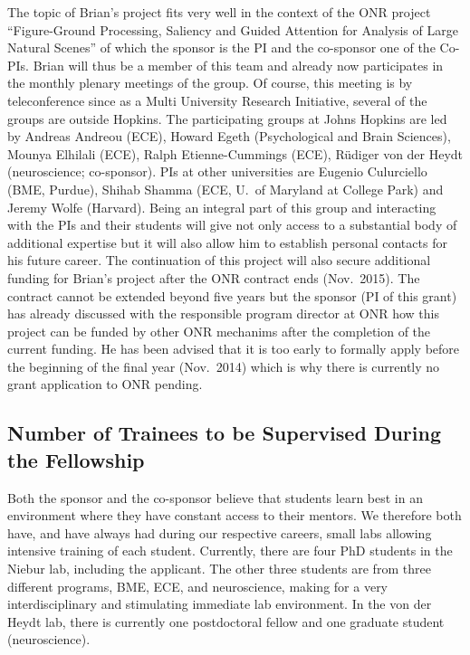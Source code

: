\documentclass[11pt,notitlepage]{article}
\begin{document}
The topic of Brian's project fits very well in the context of the
ONR project ``Figure-Ground Processing, Saliency and Guided
Attention for Analysis of Large Natural Scenes'' of which the sponsor
is the PI and the co-sponsor one of the Co-PIs. Brian will thus be a
member of this team and already now participates in the monthly
plenary meetings of the group. Of course, this meeting is by
teleconference since as a Multi University Research Initiative,
several of the groups are outside Hopkins. The participating groups at
Johns Hopkins are 
led
 by Andreas Andreou (ECE), Howard Egeth
(Psychological and Brain Sciences), Mounya Elhilali (ECE), Ralph
Etienne-Cummings (ECE), R\"udiger von der Heydt (neuroscience;
co-sponsor). PIs at other universities are Eugenio Culurciello (BME,
Purdue), Shihab Shamma (ECE, U.~of Maryland at College Park) and
Jeremy Wolfe (Harvard). Being 
an
integral part of this group and
interacting with the PIs and their students will give not only access
to a substantial body of additional expertise but it will also allow
him to establish personal contacts for his future career.
The continuation of this project will also secure additional funding
for Brian's project after the ONR contract ends (Nov.~2015). The
contract cannot be extended beyond five years but the sponsor (PI of
this grant) has already discussed with the responsible program
director at ONR how this project can be funded by other ONR mechanims
after the completion of the current funding. He has been advised that
it is too early to formally apply before the beginning of the final
year (Nov.~2014) which is why there is currently no grant application
to ONR pending.

\subsection*{Number of Trainees to be Supervised During the Fellowship}

Both the sponsor and the co-sponsor believe that students learn best
in an environment where they have constant access to their mentors. We
therefore both have, and
have
always had during our respective careers,
small labs allowing intensive training of 
each
 student. Currently,
there are four PhD students in the Niebur lab, including
the applicant. The other three students are from three different
programs, BME, ECE, and neuroscience, making for a very
interdisciplinary and stimulating immediate lab environment. In the
von der Heydt lab, there is currently one postdoctoral fellow and one
graduate student (neuroscience).
\end{document}

